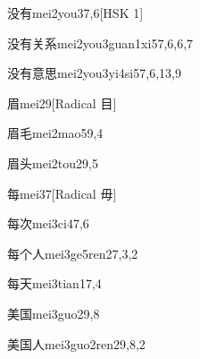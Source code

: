 \begin{entry}{没有}{mei2you3}{7,6}[HSK 1]
\end{entry}

\begin{entry}{没有关系}{mei2you3guan1xi5}{7,6,6,7}
\end{entry}

\begin{entry}{没有意思}{mei2you3yi4si5}{7,6,13,9}
\end{entry}

\begin{entry}{眉}{mei2}{9}[Radical 目]
\end{entry}

\begin{entry}{眉毛}{mei2mao5}{9,4}
\end{entry}

\begin{entry}{眉头}{mei2tou2}{9,5}
\end{entry}

\begin{entry}{每}{mei3}{7}[Radical 毋]
\end{entry}

\begin{entry}{每次}{mei3ci4}{7,6}
\end{entry}

\begin{entry}{每个人}{mei3ge5ren2}{7,3,2}
\end{entry}

\begin{entry}{每天}{mei3tian1}{7,4}
\end{entry}

\begin{entry}{美国}{mei3guo2}{9,8}
\end{entry}

\begin{entry}{美国人}{mei3guo2ren2}{9,8,2}
\end{entry}

